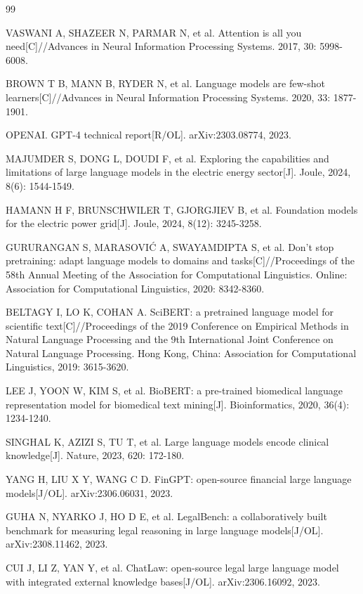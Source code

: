 \documentclass[fontset=fandol,type=master,campus=shenzhen,etitleauto=true]{hithesisbook}
\begin{document}
\begin{thebibliography}{99}

 VASWANI A, SHAZEER N, PARMAR N, et al. Attention is all you need[C]//Advances in Neural Information Processing Systems. 2017, 30: 5998-6008.

 BROWN T B, MANN B, RYDER N, et al. Language models are few-shot learners[C]//Advances in Neural Information Processing Systems. 2020, 33: 1877-1901.

 OPENAI. GPT-4 technical report[R/OL]. arXiv:2303.08774, 2023.

 MAJUMDER S, DONG L, DOUDI F, et al. Exploring the capabilities and limitations of large language models in the electric energy sector[J]. Joule, 2024, 8(6): 1544-1549.

 HAMANN H F, BRUNSCHWILER T, GJORGJIEV B, et al. Foundation models for the electric power grid[J]. Joule, 2024, 8(12): 3245-3258.

 GURURANGAN S, MARASOVIĆ A, SWAYAMDIPTA S, et al. Don't stop pretraining: adapt language models to domains and tasks[C]//Proceedings of the 58th Annual Meeting of the Association for Computational Linguistics. Online: Association for Computational Linguistics, 2020: 8342-8360.

 BELTAGY I, LO K, COHAN A. SciBERT: a pretrained language model for scientific text[C]//Proceedings of the 2019 Conference on Empirical Methods in Natural Language Processing and the 9th International Joint Conference on Natural Language Processing. Hong Kong, China: Association for Computational Linguistics, 2019: 3615-3620.

 LEE J, YOON W, KIM S, et al. BioBERT: a pre-trained biomedical language representation model for biomedical text mining[J]. Bioinformatics, 2020, 36(4): 1234-1240.

 SINGHAL K, AZIZI S, TU T, et al. Large language models encode clinical knowledge[J]. Nature, 2023, 620: 172-180.

 YANG H, LIU X Y, WANG C D. FinGPT: open-source financial large language models[J/OL]. arXiv:2306.06031, 2023.

 GUHA N, NYARKO J, HO D E, et al. LegalBench: a collaboratively built benchmark for measuring legal reasoning in large language models[J/OL]. arXiv:2308.11462, 2023.

 CUI J, LI Z, YAN Y, et al. ChatLaw: open-source legal large language model with integrated external knowledge bases[J/OL]. arXiv:2306.16092, 2023.


\end{thebibliography}
\end{document}
